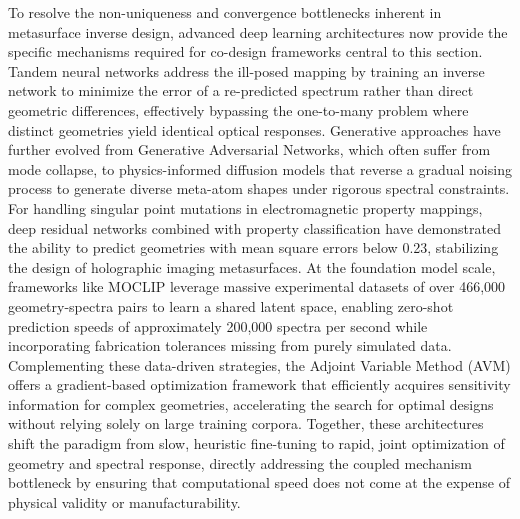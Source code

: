 To resolve the non-uniqueness and convergence bottlenecks inherent in metasurface inverse design, advanced deep learning architectures now provide the specific mechanisms required for co-design frameworks central to this section. Tandem neural networks address the ill-posed mapping by training an inverse network to minimize the error of a re-predicted spectrum rather than direct geometric differences, effectively bypassing the one-to-many problem where distinct geometries yield identical optical responses. \citep{doi_10_1063_5_0171437_92a49ec0} \citep{doi_10_1515_nanoph_2021_0434_1357d09e} Generative approaches have further evolved from Generative Adversarial Networks, which often suffer from mode collapse, to physics-informed diffusion models that reverse a gradual noising process to generate diverse meta-atom shapes under rigorous spectral constraints. \citep{doi_10_71465_fapm546_bda368a5} For handling singular point mutations in electromagnetic property mappings, deep residual networks combined with property classification have demonstrated the ability to predict geometries with mean square errors below 0.23, stabilizing the design of holographic imaging metasurfaces. At the foundation model scale, frameworks like MOCLIP leverage massive experimental datasets of over 466,000 geometry-spectra pairs to learn a shared latent space, enabling zero-shot prediction speeds of approximately 200,000 spectra per second while incorporating fabrication tolerances missing from purely simulated data. Complementing these data-driven strategies, the Adjoint Variable Method (AVM) offers a gradient-based optimization framework that efficiently acquires sensitivity information for complex geometries, accelerating the search for optimal designs without relying solely on large training corpora. \citep{doi_10_2528_pier12020501_bb5007b1} \citep{doi_10_1109_nemo62710_2025_11215427_067e96bb} Together, these architectures shift the paradigm from slow, heuristic fine-tuning to rapid, joint optimization of geometry and spectral response, directly addressing the coupled mechanism bottleneck by ensuring that computational speed does not come at the expense of physical validity or manufacturability. \citep{doi_10_1038_s41467_026_76714_x_8ca5d39b} \citep{doi_10_71465_fapm546_bda368a5} \citep{doi_10_1109_iccem60619_2024_10559188_c3199408} \citep{doi_10_1109_pn62551_2024_10621761_0bc70b78}


